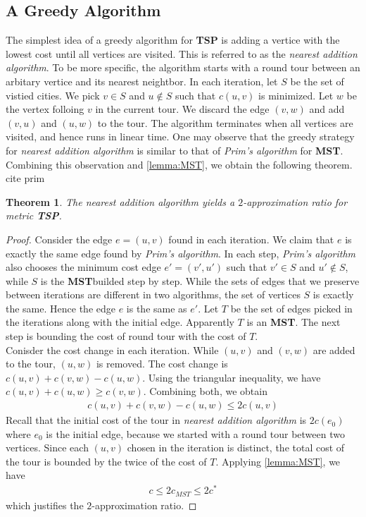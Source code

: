\documentclass[11pt,psfig,times]{article}
\newcommand*{\mst}{\textbf{MST}}
\newtheorem{theorem}{Theorem}
\begin{document}
\subsection{A Greedy Algorithm}
The simplest idea of a greedy algorithm for \textbf{TSP} is adding a vertice with the lowest cost until all vertices are visited. 
This is referred to as the \textit{nearest addition algorithm}. To be more specific, the algorithm starts with a round tour between an arbitary vertice and its 
nearest neightbor. In each iteration, let $S$ be the set of vistied cities. We pick $v \in S$ and $u \not\in S$ such that 
$c(u, v)$ is minimized. Let $w$ be the vertex folloing $v$ in the current tour. We discard the edge $(v, w)$ and add $(v, u)$ and $(u, w)$ to the tour.
The algorithm terminates when all vertices are visited, and hence runs in linear time. 
One may observe that the greedy strategy for \textit{nearest addition algorithm} is similar to that of \textit{Prim's algorithm} for \textbf{MST}.
Combining this observation and \cref{lemma:MST}, we obtain the following theorem. \color{red} cite prim \color{black}
\begin{theorem}
    The \textit{nearest addition algorithm} yields a $2$-approximation ratio for metric \textbf{TSP}.
\end{theorem}
\begin{proof}
    Consider the edge $e = (u, v)$ found in each iteration. We claim that $e$ is exactly the same edge found by \textit{Prim's algorithm}.
    In each step, \textit{Prim's algorithm} also chooses the minimum cost edge $e' = (v', u')$ such that $v' \in S$ and $u' \not\in S$, while 
    $S$ is the \mst builded step by step. While the sets of edges that we preserve between iterations are different in two algorithms, 
    the set of vertices $S$ is exactly the same. Hence the edge $e$ is the same as $e'$. 
    Let $T$ be the set of edges picked in the iterations along with the initial edge. Apparently $T$ is an \mst. The next step is bounding 
    the cost of round tour with the cost of $T$. \\
    Conisder the cost change in each iteration. While $(u, v)$ and $(v, w)$ are added to the tour, $(u, w)$ is removed. The cost change is $c(u, v) + c(v, w) - c(u, w)$.
    Using the triangular inequality, we have $c(u, v) + c(u, w) \geq c(v, w)$. Combining both, we obtain 
    \begin{align*}
        c(u, v) + c(v, w) - c(u, w) \leq 2c(u, v)
    \end{align*}
    Recall that the initial cost of the tour in \textit{nearest addition algorithm} is $2c(e_0)$ where $e_0$ is the initial edge, because we started 
    with a round tour between two vertices. Since each $(u, v)$ chosen in the iteration is distinct, the total cost of the tour is bounded by 
    the twice of the cost of $T$. Applying \cref{lemma:MST}, we have
    \begin{align*}
        c \leq 2 c_{MST} \leq 2 c^*
    \end{align*}
    which justifies the $2$-approximation ratio.
\end{proof}
\end{document}
